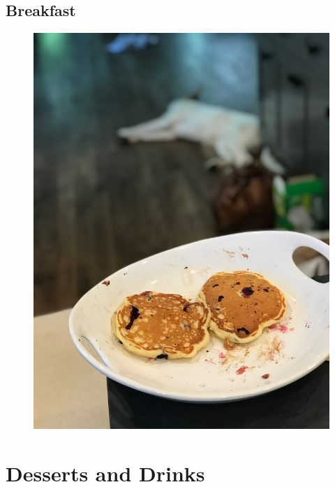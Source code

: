 \documentclass[11pt]{report}
\begin{document}
\chapter{Breakfast}
\begin{figure}[h]
\begin{center}
   \includegraphics[width=0.65\linewidth]{images/IMG_2540.jpg}
\end{center}
\end{figure}
\newpage



\part{Desserts and Drinks}
\end{document}
